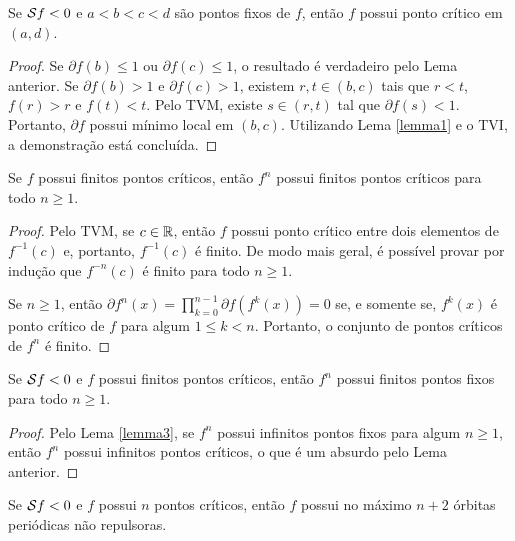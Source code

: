 \begin{lemma}
\label{lemma3}
Se $\mathcal{S} f < 0$ e $a<b<c<d$ são pontos fixos de $f$, então $f$ possui ponto crítico em $(a,d)$.
\end{lemma}

\begin{proof}
Se $\partial f(b) \leq 1$ ou $\partial f(c) \leq 1$, o resultado é verdadeiro pelo Lema anterior.
Se $\partial f(b) > 1$ e $\partial f(c) > 1$, existem $r, t \in (b,c)$ tais que $r<t$, $f(r) > r$ e $f(t) < t$.
Pelo TVM, existe $s \in (r,t)$ tal que $\partial f(s) < 1$.
Portanto, $\partial f$ possui mínimo local em $(b,c)$.
Utilizando Lema \ref{lemma1} e o TVI, a demonstração está concluída.
\end{proof}

\begin{lemma}
Se $f$ possui finitos pontos críticos, então $f^n$ possui finitos pontos críticos para todo $n \geq 1$.
\end{lemma}
\begin{proof}
Pelo TVM, se $c \in \mathbb{R}$, então $f$ possui ponto crítico entre dois elementos de $f^{-1}(c)$ e, portanto, $f^{-1}(c)$ é finito.
De modo mais geral, é possível provar por indução que $f^{-n}(c)$ é finito para todo $n \geq 1$.

Se $n \geq 1$, então $\partial f^n(x) = \prod_{k=0}^{n-1} \partial f(f^k(x)) = 0$ se, e somente se, $f^k(x)$ é ponto crítico de $f$ para algum $1 \leq k < n$.
Portanto, o conjunto de pontos críticos de $f^n$ é finito.
\end{proof}

\begin{lemma}
Se $\mathcal{S} f < 0$ e $f$ possui finitos pontos críticos, então $f^n$ possui finitos pontos fixos para todo $n \geq 1$.
\end{lemma}

\begin{proof}
Pelo Lema \ref{lemma3}, se $f^n$ possui infinitos pontos fixos para algum $n \geq 1$, então $f^n$ possui infinitos pontos críticos, o que é um absurdo pelo Lema anterior.
\end{proof}

\begin{theorem}[Singer]
Se $\mathcal{S} f < 0$ e $f$ possui $n$ pontos críticos, então $f$ possui no máximo $n+2$ órbitas periódicas não repulsoras.
\end{theorem}

